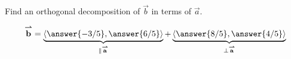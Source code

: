 \documentclass{ximera}
\begin{document}
\begin{problem}
  Find an orthogonal decomposition of $\vec{b}$ in terms of $\vec{a}$.
  \begin{prompt}
    \[
    \vec{b} = \underbrace{\vector{\answer{-3/5},\answer{6/5}}}_{\parallel \vec a} + \underbrace{\vector{ \answer{8/5},\answer{4/5}}}_{\perp\vec a}
    \]
  \end{prompt}

  \vfill
\end{problem}
\end{document}
